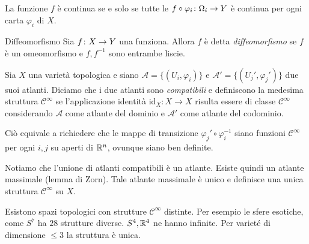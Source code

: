\documentclass[a4paper]{article}
\begin{document}
\begin{center}
\end{center}

La funzione \(f\) è continua se e solo se
tutte le \(f \circ \varphi_i \colon \Omega_i \to Y\)
è continua per ogni carta \(\varphi_i\) di \(X\).

\begin{snippetdefinition}{Diffeomorfismo}
    Sia \(f \colon X \to Y\) una funziona.
    Allora \(f\) è detta \emph{diffeomorfismo}
    se \(f\) è un omeomorfismo e \(f,f^{-1}\) sono entrambe liscie.
\end{snippetdefinition}

\begin{snippetdefinition}{} 
    Sia \(X\) una varietà topologica e siano
    \(\mathcal{A} = \{(U_i, \varphi_i)\}\) e
    \(\mathcal{A}' = \{(U_j', \varphi_j')\}\) due suoi atlanti.
    Diciamo che i due atlanti sono \emph{compatibili} e definiscono la medesima struttura
    \(\mathcal{C}^\infty\) se l'applicazione
    identità \(\text{id}_X: X \to X\) risulta essere di
    classe \(\mathcal{C}^\infty\) considerando \(\mathcal{A}\) come atlante del
    dominio e \(\mathcal{A}'\) come atlante del codominio. 
\end{snippetdefinition} 

Ciò equivale a richiedere che le mappe di transizione \(\varphi_j' \circ \varphi_i^{-1}\) siano
funzioni \(\mathcal{C}^\infty\) per ogni \(i,j\) su aperti di \(\mathbb{R}^n\), ovunque siano ben definite.

Notiamo che l'unione di atlanti compatibili è un atlante.
Esiste quindi un atlante massimale (lemma di Zorn).
Tale atlante massimale è unico e definisce una unica struttura \(\mathcal C^\infty\)
su \(X\).

\begin{snippetexample}{}
    Esistono spazi topologici con strutture \(\mathcal C^\infty\)
    distinte. Per esempio le sfere esotiche, come \(S^7\)
    ha \(28\) strutture diverse. \(S^4, \mathbb{R}^4\) ne hanno infinite.
    Per varieté di dimensione \(\leq 3\) la struttura è unica.
\end{snippetexample}
\end{document}
